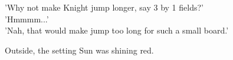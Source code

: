 \noindent
'Why not make Knight jump longer, say 3 by 1 fields?' \\
'Hmmmm...' \\
'Nah, that would make jump too long for such a small board.'

Outside, the setting Sun was shining red.

\vspace*{1.1\baselineskip}
\begin{flushright}
\parbox{0.6\textwidth}{
\emph{ \hspace*{\fill}{late November, 1975} \\
\hspace*{\fill}{Bednja, Croatia} } }
\end{flushright}

\clearpage %
